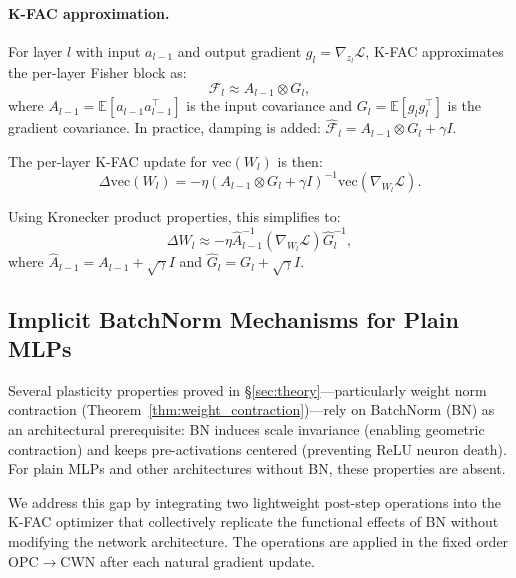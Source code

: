 \documentclass{article}
\providecommand{\E}{\mathbb{E}}
\providecommand{\FIM}{\mathcal{F}}
\theoremstyle{plain}
\theoremstyle{definition}
\theoremstyle{remark}
\begin{document}
\paragraph{K-FAC approximation.} For layer $l$ with input $a_{l-1}$ and output gradient $g_l = \nabla_{z_l}\mathcal{L}$, K-FAC \citep{martens2015optimizing} approximates the per-layer Fisher block as:
\begin{equation}
\label{eq:kfac}
    \FIM_l \approx A_{l-1} \otimes G_l,
\end{equation}
where $A_{l-1} = \E[a_{l-1} a_{l-1}^\top]$ is the input covariance and $G_l = \E[g_l g_l^\top]$ is the gradient covariance. In practice, damping is added: $\hat{\FIM}_l = A_{l-1} \otimes G_l + \gamma I$.

The per-layer K-FAC update for $\mathrm{vec}(W_l)$ is then:
\begin{equation}
\label{eq:kfac_update}
    \Delta \mathrm{vec}(W_l) = -\eta \left(A_{l-1} \otimes G_l + \gamma I\right)^{-1} \mathrm{vec}(\nabla_{W_l}\mathcal{L}).
\end{equation}

Using Kronecker product properties, this simplifies to:
\begin{equation}
\label{eq:kfac_matrix}
    \Delta W_l \approx -\eta \hat{A}_{l-1}^{-1} (\nabla_{W_l}\mathcal{L}) \hat{G}_l^{-1},
\end{equation}
where $\hat{A}_{l-1} = A_{l-1} + \sqrt{\gamma}I$ and $\hat{G}_l = G_l + \sqrt{\gamma}I$.

\subsection{Implicit BatchNorm Mechanisms for Plain MLPs}
\label{subsec:implicit_bn}

Several plasticity properties proved in \S\ref{sec:theory}---particularly weight norm contraction (Theorem~\ref{thm:weight_contraction})---rely on BatchNorm (BN) as an architectural prerequisite: BN induces scale invariance (enabling geometric contraction) and keeps pre-activations centered (preventing ReLU neuron death). For plain MLPs and other architectures without BN, these properties are absent.

We address this gap by integrating two lightweight post-step operations into the K-FAC optimizer that collectively replicate the functional effects of BN without modifying the network architecture. The operations are applied in the fixed order $\mathrm{OPC} \to \mathrm{CWN}$ after each natural gradient update.
\end{document}
